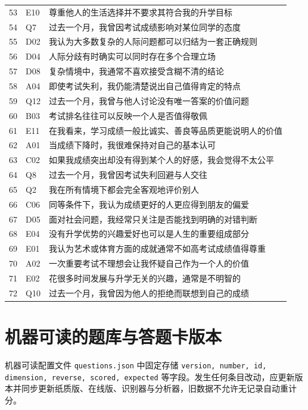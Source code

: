 \documentclass[11pt,a4paper,UTF8,fontset=none]{ctexart}
\begin{document}
\begin{longtable}{p{0.9cm}p{1.2cm}p{11.1cm}}
53&E10&尊重他人的生活选择并不要求其符合我的升学目标\\
54&Q7&过去一个月，我曾因考试成绩影响对某位同学的态度\\
55&D02&我认为大多数复杂的人际问题都可以归结为一套正确规则\\
56&D04&人际分歧有时确实可以同时存在多个合理立场\\
57&D08&复杂情境中，我通常不喜欢接受含糊不清的结论\\
58&A04&即使考试失利，我仍能清楚说出自己值得肯定的特点\\
59&Q12&过去一个月，我曾与他人讨论没有唯一答案的价值问题\\
60&B03&考试排名往往可以反映一个人是否值得敬佩\\
61&E11&在我看来，学习成绩一般比诚实、善良等品质更能说明人的价值\\
62&A01&当成绩下降时，我很难保持对自己的基本认可\\
63&C02&如果我成绩突出却没有得到某个人的好感，我会觉得不太公平\\
64&Q8&过去一个月，我曾因考试失利回避与人交往\\
65&Q2&我在所有情境下都会完全客观地评价别人\\
66&C06&同等条件下，我认为成绩更好的人更应得到朋友的偏爱\\
67&D05&面对社会问题，我经常只关注是否能找到明确的对错判断\\
68&E04&没有升学优势的兴趣爱好也可以是人生的重要组成部分\\
69&E01&我认为艺术或体育方面的成就通常不如高考试成绩值得尊重\\
70&A02&一次重要考试不理想会让我怀疑自己作为一个人的价值\\
71&E02&花很多时间发展与升学无关的兴趣，通常是不明智的\\
72&Q10&过去一个月，我曾因为他人的拒绝而联想到自己的成绩\\
\bottomrule\end{longtable}
\section{机器可读的题库与答题卡版本}
机器可读配置文件 \texttt{questions.json} 中固定存储 \texttt{version, number, id, dimension, reverse, scored, expected} 等字段。发生任何条目改动，应更新版本并同步更新纸质版、在线版、识别器与分析器，旧数据不允许无记录自动重计分。
\end{document}
